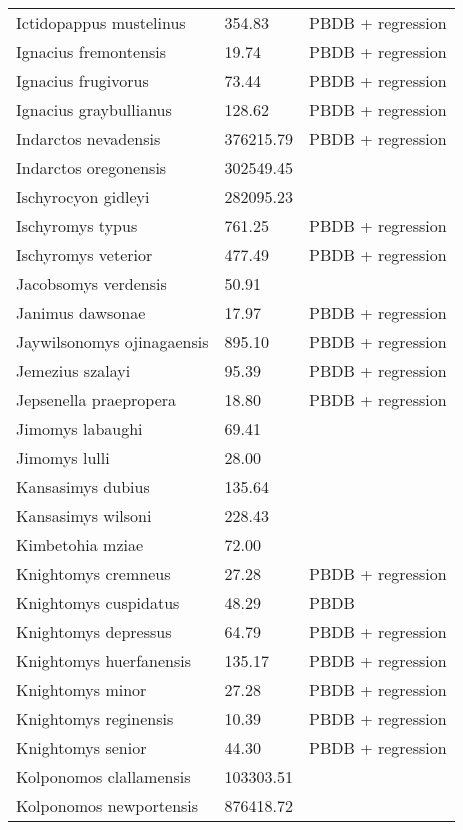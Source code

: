 \begin{center}
\begin{longtable}{p{} p{} p{} }
  Ictidopappus mustelinus & 354.83 & PBDB + regression \\ 
  Ignacius fremontensis & 19.74 & PBDB + regression \\ 
  Ignacius frugivorus & 73.44 & PBDB + regression \\ 
  Ignacius graybullianus & 128.62 & PBDB + regression \\ 
  Indarctos nevadensis & 376215.79 & PBDB + regression \\ 
  Indarctos oregonensis & 302549.45 & \cite{Tomiya2013} \\ 
  Ischyrocyon gidleyi & 282095.23 & \cite{Tomiya2013} \\ 
  Ischyromys typus & 761.25 & PBDB + regression \\ 
  Ischyromys veterior & 477.49 & PBDB + regression \\ 
  Jacobsomys verdensis & 50.91 & \cite{Tomiya2013} \\ 
  Janimus dawsonae & 17.97 & PBDB + regression \\ 
  Jaywilsonomys ojinagaensis & 895.10 & PBDB + regression \\ 
  Jemezius szalayi & 95.39 & PBDB + regression \\ 
  Jepsenella praepropera & 18.80 & PBDB + regression \\ 
  Jimomys labaughi & 69.41 & \cite{Tomiya2013} \\ 
  Jimomys lulli & 28.00 & \cite{McKenna2011} \\ 
  Kansasimys dubius & 135.64 & \cite{Tomiya2013} \\ 
  Kansasimys wilsoni & 228.43 & \cite{Matthew1901} \\ 
  Kimbetohia mziae & 72.00 & \cite{Wilson2012} \\ 
  Knightomys cremneus & 27.28 & PBDB + regression \\ 
  Knightomys cuspidatus & 48.29 & PBDB \\ 
  Knightomys depressus & 64.79 & PBDB + regression \\ 
  Knightomys huerfanensis & 135.17 & PBDB + regression \\ 
  Knightomys minor & 27.28 & PBDB + regression \\ 
  Knightomys reginensis & 10.39 & PBDB + regression \\ 
  Knightomys senior & 44.30 & PBDB + regression \\ 
  Kolponomos clallamensis & 103303.51 & \cite{Tseng2009} \\ 
  Kolponomos newportensis & 876418.72 & \cite{Scott2013} \\ 

\end{longtable}
\end{center}
